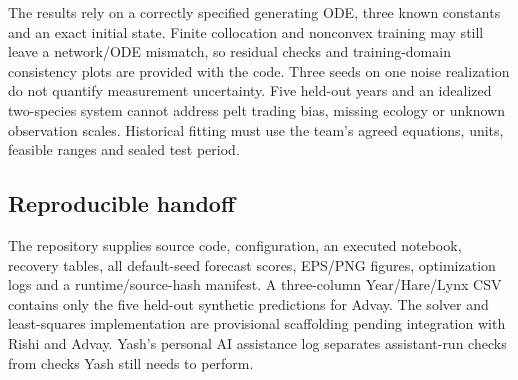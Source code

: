 The results rely on a correctly specified generating ODE, three known constants and
an exact initial state. Finite collocation and nonconvex training may still leave a
network/ODE mismatch, so residual checks and training-domain consistency plots are
provided with the code. Three seeds on one noise realization do not quantify measurement
uncertainty. Five held-out years and an idealized two-species system cannot address pelt
trading bias, missing ecology or unknown observation scales. Historical fitting must
use the team's agreed equations, units, feasible ranges and sealed test period.

\subsection{Reproducible handoff}
The repository supplies source code, configuration, an executed notebook, recovery
tables, all default-seed forecast scores, EPS/PNG figures, optimization logs and a
runtime/source-hash manifest. A three-column Year/Hare/Lynx CSV contains only the five
held-out synthetic predictions for Advay. The solver and least-squares implementation
are provisional scaffolding pending integration with Rishi and Advay. Yash's personal
AI assistance log separates assistant-run checks from checks Yash still needs to perform.
